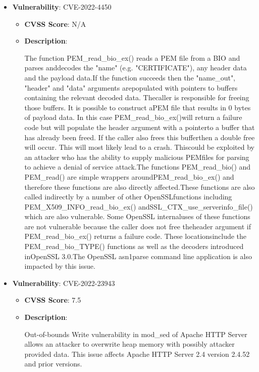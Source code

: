 \documentclass{article}
\begin{document}
\begin{itemize}
        \item \textbf{Vulnerability}: CVE-2022-4450
        \begin{itemize}
            \item \textbf{CVSS Score}:  N/A 
            \item \textbf{Description}:
            \parbox[t]{0.9\linewidth}{
                \ttfamily The function PEM\_read\_bio\_ex() reads a PEM file from a BIO and parses anddecodes the "name" (e.g. "CERTIFICATE"), any header data and the payload data.If the function succeeds then the "name\_out", "header" and "data" arguments arepopulated with pointers to buffers containing the relevant decoded data. Thecaller is responsible for freeing those buffers. It is possible to construct aPEM file that results in 0 bytes of payload data. In this case PEM\_read\_bio\_ex()will return a failure code but will populate the header argument with a pointerto a buffer that has already been freed. If the caller also frees this bufferthen a double free will occur. This will most likely lead to a crash. Thiscould be exploited by an attacker who has the ability to supply malicious PEMfiles for parsing to achieve a denial of service attack.The functions PEM\_read\_bio() and PEM\_read() are simple wrappers aroundPEM\_read\_bio\_ex() and therefore these functions are also directly affected.These functions are also called indirectly by a number of other OpenSSLfunctions including PEM\_X509\_INFO\_read\_bio\_ex() andSSL\_CTX\_use\_serverinfo\_file() which are also vulnerable. Some OpenSSL internaluses of these functions are not vulnerable because the caller does not free theheader argument if PEM\_read\_bio\_ex() returns a failure code. These locationsinclude the PEM\_read\_bio\_TYPE() functions as well as the decoders introduced inOpenSSL 3.0.The OpenSSL asn1parse command line application is also impacted by this issue.
            }
        \end{itemize}
    
        \item \textbf{Vulnerability}: CVE-2022-23943
        \begin{itemize}
            \item \textbf{CVSS Score}:  7.5 
            \item \textbf{Description}:
            \parbox[t]{0.9\linewidth}{
                \ttfamily Out-of-bounds Write vulnerability in mod\_sed of Apache HTTP Server allows an attacker to overwrite heap memory with possibly attacker provided data. This issue affects Apache HTTP Server 2.4 version 2.4.52 and prior versions.
            }
        \end{itemize}
    

\end{itemize}
\end{document}
